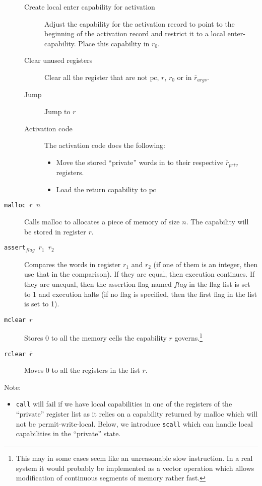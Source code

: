 \documentclass[a4paper]{article}
\newcommand{\var}[1]{\mathit{#1}}
\newcommand{\pcreg}{\mathrm{pc}}
\begin{document}
\begin{description}
\begin{description}
\begin{itemize}
    \end{itemize}
  \item [Create local enter capability for activation] Adjust the capability for the activation record to point to the beginning of the activation record and restrict it to a local enter-capability. Place this capability in $r_0$.
  \item [Clear unused registers]
    Clear all the register that are not $\pcreg$, $r$, $r_0$ or in $\bar{r}_{\var{args}}$.
  \item [Jump] Jump to $r$
  \item [Activation code] The activation code does the following:
    \begin{itemize}
    \item Move the stored ``private'' words in to their respective $\bar{r}_{\var{priv}}$ registers.
    \item Load the return capability to $\pcreg$
    \end{itemize}
  \end{description}
\item[\texttt{malloc $r$ $n$}] Calls malloc to allocates a piece of memory of size $n$. The capability will be stored in register $r$.

\item[\texttt{assert$_{\var{flag}}$ $r_1$ $r_2$}] Compares the words in register $r_1$ and $r_2$ (if one of them is an integer, then use that in the comparison). If they are equal, then execution continues. If they are unequal, then the assertion flag named $\var{flag}$ in the flag list is set to 1 and execution halts (if no flag is specified, then the first flag in the list is set to 1).
\item[\texttt{mclear $r$}] Stores 0 to all the memory cells the capability $r$ governs.\footnote{This may in some cases seem like an unreasonable slow instruction. In a real system it would probably be implemented as a vector operation which allows modification of continuous segments of memory rather fast.}
\item[\texttt{rclear $\bar{r}$}] Moves 0 to all the registers in the list $\bar{r}$.
\end{description}
Note:
\begin{itemize}
\item \texttt{call} will fail if we have local capabilities in one of the registers of the ``private'' register list as it relies on a capability returned by malloc which will not be permit-write-local. Below, we introduce \texttt{scall} which can handle local capabilities in the ``private'' state.
\end{itemize}
\end{document}
